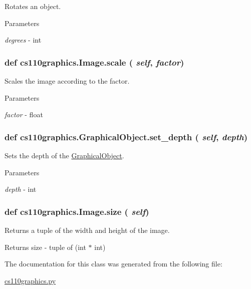 Rotates an object. 
\begin{DoxyParams}{Parameters}
\item[{\em degrees}]-\/ int \end{DoxyParams}
\hypertarget{classcs110graphics_1_1Image_a7a59fde33fe83916a4155fafb5cfb01e}{
\subsubsection[{scale}]{\setlength{\rightskip}{0pt plus 5cm}def cs110graphics.Image.scale ( {\em self}, \/   {\em factor})}}
\label{classcs110graphics_1_1Image_a7a59fde33fe83916a4155fafb5cfb01e}


Scales the image according to the factor. 
\begin{DoxyParams}{Parameters}
\item[{\em factor}]-\/ float \end{DoxyParams}
\hypertarget{classcs110graphics_1_1GraphicalObject_a20d76d4ee4419c3065d61deb6cbc6700}{
\subsubsection[{set\_\-depth}]{\setlength{\rightskip}{0pt plus 5cm}def cs110graphics.GraphicalObject.set\_\-depth ( {\em self}, \/   {\em depth})}}
\label{classcs110graphics_1_1GraphicalObject_a20d76d4ee4419c3065d61deb6cbc6700}


Sets the depth of the \hyperlink{classcs110graphics_1_1GraphicalObject}{GraphicalObject}. 
\begin{DoxyParams}{Parameters}
\item[{\em depth}]-\/ int \end{DoxyParams}
\hypertarget{classcs110graphics_1_1Image_a4ff2da7a167a433f2c38f1e2e2fe7263}{
\subsubsection[{size}]{\setlength{\rightskip}{0pt plus 5cm}def cs110graphics.Image.size ( {\em self})}}
\label{classcs110graphics_1_1Image_a4ff2da7a167a433f2c38f1e2e2fe7263}


Returns a tuple of the width and height of the image. \begin{DoxyReturn}{Returns}
size -\/ tuple of (int $\ast$ int) 
\end{DoxyReturn}


The documentation for this class was generated from the following file:\begin{DoxyCompactItemize}
\item 
\hyperlink{cs110graphics_8py}{cs110graphics.py}\end{DoxyCompactItemize}
